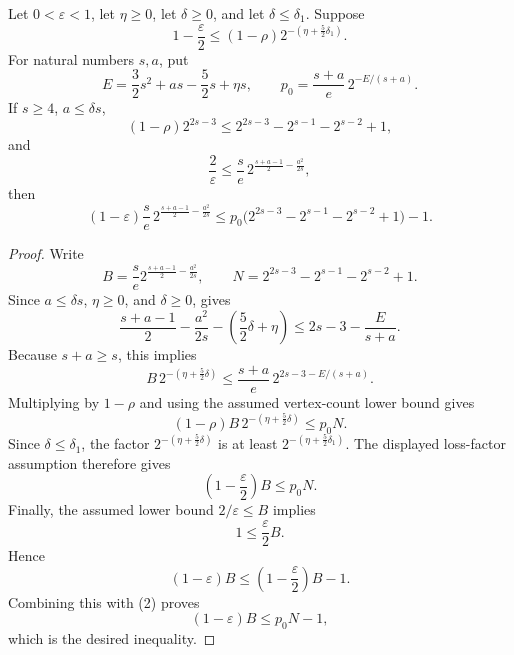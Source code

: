 \begin{helper}
Let \(0<\varepsilon<1\), let \(\eta\ge0\), let \(\delta\ge0\), and let
\(\delta\le\delta_1\).  Suppose
\[
  1-\frac{\varepsilon}{2}
  \le
  (1-\rho)2^{-(\eta+\frac52\delta_1)}.
\]
For natural numbers \(s,a\), put
\[
  E=\frac32s^2+as-\frac52s+\eta s,\qquad
  p_0=\frac{s+a}{e}\,2^{-E/(s+a)}.
\]
If \(s\ge4\), \(a\le\delta s\),
\[
  (1-\rho)2^{2s-3}\le
  2^{2s-3}-2^{s-1}-2^{s-2}+1,
\]
and
\[
  \frac{2}{\varepsilon}
  \le
  \frac{s}{e}\,2^{\frac{s+a-1}{2}-\frac{a^2}{2s}},
\]
then
\[
  (1-\varepsilon)\frac{s}{e}\,
  2^{\frac{s+a-1}{2}-\frac{a^2}{2s}}
  \le
  p_0\bigl(2^{2s-3}-2^{s-1}-2^{s-2}+1\bigr)-1.
\]
\end{helper}
\begin{proof}
Write
\[
  B=\frac{s}{e}2^{\frac{s+a-1}{2}-\frac{a^2}{2s}},
  \qquad
  N=2^{2s-3}-2^{s-1}-2^{s-2}+1.
\]
Since \(a\le\delta s\), \(\eta\ge0\), and \(\delta\ge0\),
 gives
\[
  \frac{s+a-1}{2}-\frac{a^2}{2s}
  -\left(\frac52\delta+\eta\right)
  \le
  2s-3-\frac{E}{s+a}.
\]
Because \(s+a\ge s\), this implies
\[
  B\,2^{-(\eta+\frac52\delta)}
  \le
  \frac{s+a}{e}\,2^{2s-3-E/(s+a)}.
\]
Multiplying by \(1-\rho\) and using the assumed vertex-count lower bound
gives
\[
  (1-\rho)B\,2^{-(\eta+\frac52\delta)}
  \le p_0N. \tag{1}
\]
Since \(\delta\le\delta_1\), the factor
\(2^{-(\eta+\frac52\delta)}\) is at least
\(2^{-(\eta+\frac52\delta_1)}\).  The displayed loss-factor assumption
therefore gives
\[
  \left(1-\frac{\varepsilon}{2}\right)B\le p_0N. \tag{2}
\]
Finally, the assumed lower bound \(2/\varepsilon\le B\) implies
\[
  1\le \frac{\varepsilon}{2}B.
\]
Hence
\[
  (1-\varepsilon)B
  \le
  \left(1-\frac{\varepsilon}{2}\right)B-1.
\]
Combining this with (2) proves
\[
  (1-\varepsilon)B\le p_0N-1,
\]
which is the desired inequality.
\end{proof}
